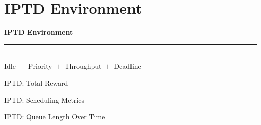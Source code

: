 
\section{IPTD Environment}

\begin{frame}[plain]
  \vfill
  \begin{center}
    {\Huge\bfseries\color{DeepBlue} IPTD Environment}\\[0.6em]
    {\color{SkyBlue}\rule{0.40\linewidth}{1.4pt}}\\[0.7em]
    {\large\color{DeepBlue!80!black} Idle \,$+$\, Priority \,$+$\, Throughput \,$+$\, Deadline}
  \end{center}
  \vfill
\end{frame}

\begin{frame}{IPTD: Total Reward}
  \centering
\end{frame}

\begin{frame}{IPTD: Scheduling Metrics}
  \centering
\end{frame}

\begin{frame}{IPTD: Queue Length Over Time}
  \centering
\end{frame}
